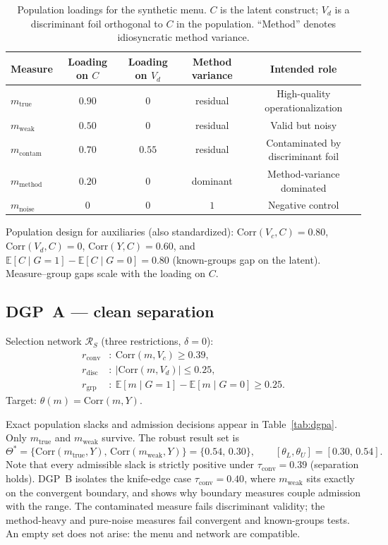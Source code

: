 \documentclass[10pt,letterpaper]{article}
\newcommand{\E}{\mathbb{E}}
\newcommand{\Rset}{\mathcal{R}}
\begin{document}
\begin{table}[t]
\centering
\small
\caption{Population loadings for the synthetic menu.
$C$ is the latent construct; $V_{\!d}$ is a discriminant foil orthogonal to $C$ in the population.
``Method'' denotes idiosyncratic method variance.}
\label{tab:loadings}
\begin{tabular}{@{}lcccc@{}}
\toprule
Measure & Loading on $C$ & Loading on $V_{\!d}$ & Method variance & Intended role \\
\midrule
$m_{\mathrm{true}}$   & $0.90$ & $0$    & residual & High-quality operationalization \\
$m_{\mathrm{weak}}$   & $0.50$ & $0$    & residual & Valid but noisy \\
$m_{\mathrm{contam}}$ & $0.70$ & $0.55$ & residual & Contaminated by discriminant foil \\
$m_{\mathrm{method}}$ & $0.20$ & $0$    & dominant & Method-variance dominated \\
$m_{\mathrm{noise}}$  & $0$    & $0$    & $1$     & Negative control \\
\bottomrule
\end{tabular}
\end{table}

Population design for auxiliaries (also standardized):
$\mathrm{Corr}(V_{\!c},C)=0.80$,
$\mathrm{Corr}(V_{\!d},C)=0$,
$\mathrm{Corr}(Y,C)=0.60$,
and $\E[C\mid G{=}1]-\E[C\mid G{=}0]=0.80$ (known-groups gap on the latent).
Measure--group gaps scale with the loading on $C$.

\subsection{DGP~A --- clean separation}
Selection network $\Rset_S$ (three restrictions, $\delta=0$):
\begin{align}
r_{\mathrm{conv}}&:\ \mathrm{Corr}(m,V_{\!c})\ge 0.39,
\label{eq:rconv}\\
r_{\mathrm{disc}}&:\ \bigl|\mathrm{Corr}(m,V_{\!d})\bigr|\le 0.25,
\label{eq:rdisc}\\
r_{\mathrm{grp}}&:\ \E[m\mid G{=}1]-\E[m\mid G{=}0]\ge 0.25.
\label{eq:rgrp}
\end{align}
Target: $\theta(m)=\mathrm{Corr}(m,Y)$.

Exact population slacks and admission decisions appear in Table~\ref{tab:dgpa}.
Only $m_{\mathrm{true}}$ and $m_{\mathrm{weak}}$ survive.
The robust result set is
\begin{equation}
\Theta^*=\bigl\{\mathrm{Corr}(m_{\mathrm{true}},Y),\,\mathrm{Corr}(m_{\mathrm{weak}},Y)\bigr\}
=\bigl\{0.54,\,0.30\bigr\},
\qquad [\theta_L,\theta_U]=[0.30,\,0.54].
\label{eq:dgpa-range}
\end{equation}
Note that every admissible slack is strictly positive under $\tau_{\mathrm{conv}}=0.39$ (separation holds).
DGP~B isolates the knife-edge case $\tau_{\mathrm{conv}}=0.40$, where $m_{\mathrm{weak}}$ sits exactly on the convergent boundary, and shows why boundary measures couple admission with the range.
The contaminated measure fails discriminant validity; the method-heavy and pure-noise measures fail convergent and known-groups tests.
An empty set does not arise: the menu and network are compatible.
\end{document}
